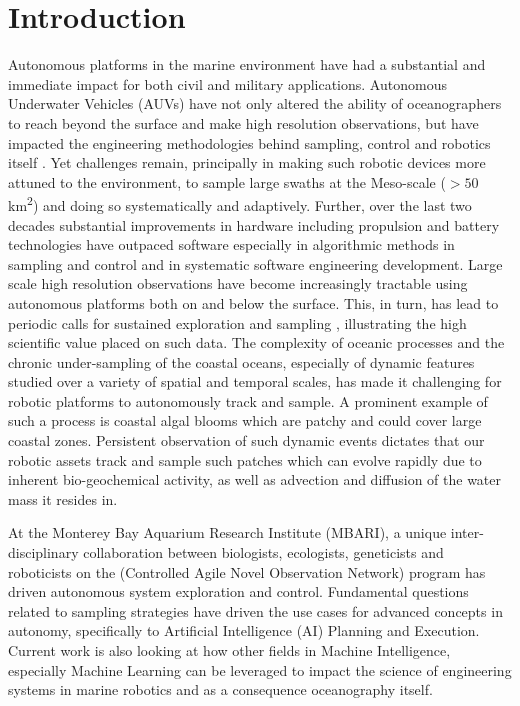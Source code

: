 \section{Introduction}
\label{sec:intro}

\setcounter{footnote}{0}


Autonomous platforms in the marine environment have had a substantial
and immediate impact for both civil and military
applications. Autonomous Underwater Vehicles (AUVs) have not only
altered the ability of oceanographers to reach beyond the surface and
make high resolution observations, but have impacted the engineering
methodologies behind sampling, control and robotics itself
\cite{Brierley08032002,ryan05,Thomas06,Yoerger01012007,Incze2009,Rigby10}. Yet
challenges remain, principally in making such robotic devices more
attuned to the environment, to sample large swaths at the Meso-scale
($> 50$ km\textsuperscript{2}) and doing so systematically and
adaptively. Further, over the last two decades substantial
improvements in hardware including propulsion and battery technologies
have outpaced software especially in algorithmic methods in sampling
and control and in systematic software engineering development. Large
scale high resolution observations have become increasingly tractable
using autonomous platforms both on and below the surface.  This, in
turn, has lead to periodic calls for sustained exploration and
sampling \cite{rudnick03}, illustrating the high scientific value
placed on such data.  The complexity of oceanic processes and the
chronic under-sampling of the coastal oceans, especially of dynamic
features studied over a variety of spatial and temporal scales, has
made it challenging for robotic platforms to autonomously track and
sample. A prominent example of such a process is coastal algal blooms
which are patchy and could cover large coastal zones. Persistent
observation of such dynamic events dictates that our robotic assets
track and sample such patches which can evolve rapidly due to inherent
bio-geochemical activity, as well as advection and diffusion of the
water mass it resides in.

At the Monterey Bay Aquarium Research Institute (MBARI), a unique
inter-disciplinary collaboration between biologists, ecologists,
geneticists and roboticists on the \can (Controlled Agile Novel
Observation Network) program \cite{canon} has driven autonomous system
exploration and control. Fundamental questions related to sampling
strategies have driven the use cases for advanced concepts in
autonomy, specifically to Artificial Intelligence (AI) Planning and
Execution. Current work is also looking at how other fields in Machine
Intelligence, especially Machine Learning can be leveraged to impact
the science of engineering systems in marine robotics and as a
consequence oceanography itself.

